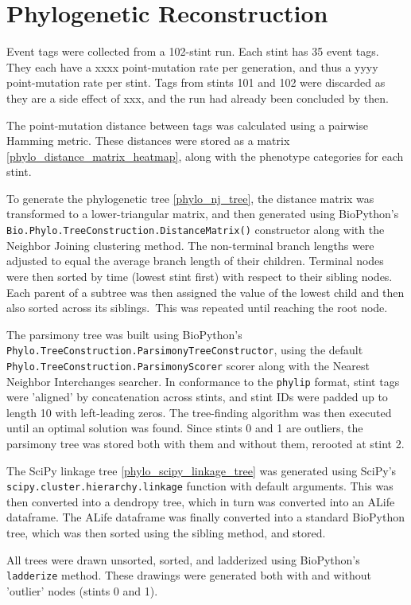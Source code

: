 \section{Phylogenetic Reconstruction}

Event tags were collected from a 102-stint run.
Each stint has 35 event tags.
They each have a xxxx point-mutation rate per generation, and thus a yyyy point-mutation rate per stint.
Tags from stints 101 and 102 were discarded as they are a side effect of xxx, and the run had already been concluded by then.

The point-mutation distance between tags was calculated using a pairwise Hamming metric.
These distances were stored as a matrix \ref{phylo_distance_matrix_heatmap}, along with the phenotype categories for each stint.

To generate the phylogenetic tree \ref{phylo_nj_tree}, the distance matrix was transformed to a lower-triangular matrix, and then generated using BioPython's \texttt{Bio.Phylo.TreeConstruction.DistanceMatrix()} constructor along with the Neighbor Joining clustering method.
The non-terminal branch lengths were adjusted to equal the average branch length of their children.
Terminal nodes were then sorted by time (lowest stint first) with respect to their sibling nodes.
Each parent of a subtree was then assigned the value of the lowest child and then also sorted across its siblings.\
This was repeated until reaching the root node.

The parsimony tree was built using BioPython's \texttt{Phylo.TreeConstruction.ParsimonyTreeConstructor}, using the default \texttt{Phylo.TreeConstruction.ParsimonyScorer} scorer along with the Nearest Neighbor Interchanges searcher.
In conformance to the \texttt{phylip} format, stint tags were 'aligned' by concatenation across stints, and stint IDs were padded up to length 10 with left-leading zeros.
The tree-finding algorithm was then executed until an optimal solution was found.
Since stints 0 and 1 are outliers, the parsimony tree was stored both with them and without them, rerooted at stint 2.

The SciPy linkage tree \ref{phylo_scipy_linkage_tree} was generated using SciPy's \texttt{scipy.cluster.hierarchy.linkage} function with default arguments.
This was then converted into a dendropy tree, which in turn was converted into an ALife dataframe.
The ALife dataframe was finally converted into a standard BioPython tree, which was then sorted using the sibling method, and stored.

All trees were drawn unsorted, sorted, and ladderized using BioPython's \texttt{ladderize} method.
These drawings were generated both with and without 'outlier' nodes (stints 0 and 1).







